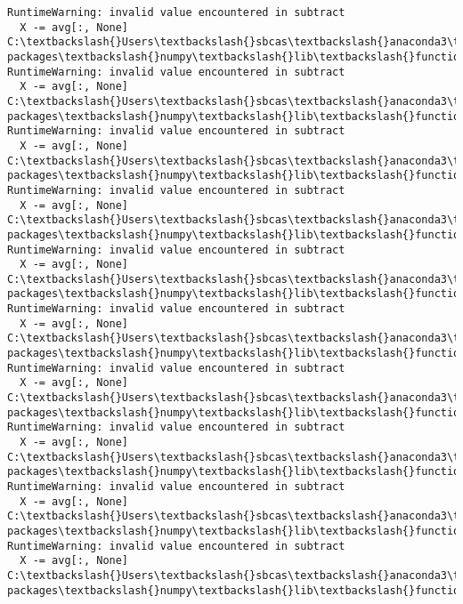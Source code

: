 \documentclass[11pt]{article}
\begin{document}
\begin{Verbatim}[commandchars=\\\{\}]
RuntimeWarning: invalid value encountered in subtract
  X -= avg[:, None]
C:\textbackslash{}Users\textbackslash{}sbcas\textbackslash{}anaconda3\textbackslash{}lib\textbackslash{}site-packages\textbackslash{}numpy\textbackslash{}lib\textbackslash{}function\_base.py:2474:
RuntimeWarning: invalid value encountered in subtract
  X -= avg[:, None]
C:\textbackslash{}Users\textbackslash{}sbcas\textbackslash{}anaconda3\textbackslash{}lib\textbackslash{}site-packages\textbackslash{}numpy\textbackslash{}lib\textbackslash{}function\_base.py:2474:
RuntimeWarning: invalid value encountered in subtract
  X -= avg[:, None]
C:\textbackslash{}Users\textbackslash{}sbcas\textbackslash{}anaconda3\textbackslash{}lib\textbackslash{}site-packages\textbackslash{}numpy\textbackslash{}lib\textbackslash{}function\_base.py:2474:
RuntimeWarning: invalid value encountered in subtract
  X -= avg[:, None]
C:\textbackslash{}Users\textbackslash{}sbcas\textbackslash{}anaconda3\textbackslash{}lib\textbackslash{}site-packages\textbackslash{}numpy\textbackslash{}lib\textbackslash{}function\_base.py:2474:
RuntimeWarning: invalid value encountered in subtract
  X -= avg[:, None]
C:\textbackslash{}Users\textbackslash{}sbcas\textbackslash{}anaconda3\textbackslash{}lib\textbackslash{}site-packages\textbackslash{}numpy\textbackslash{}lib\textbackslash{}function\_base.py:2474:
RuntimeWarning: invalid value encountered in subtract
  X -= avg[:, None]
C:\textbackslash{}Users\textbackslash{}sbcas\textbackslash{}anaconda3\textbackslash{}lib\textbackslash{}site-packages\textbackslash{}numpy\textbackslash{}lib\textbackslash{}function\_base.py:2474:
RuntimeWarning: invalid value encountered in subtract
  X -= avg[:, None]
C:\textbackslash{}Users\textbackslash{}sbcas\textbackslash{}anaconda3\textbackslash{}lib\textbackslash{}site-packages\textbackslash{}numpy\textbackslash{}lib\textbackslash{}function\_base.py:2474:
RuntimeWarning: invalid value encountered in subtract
  X -= avg[:, None]
C:\textbackslash{}Users\textbackslash{}sbcas\textbackslash{}anaconda3\textbackslash{}lib\textbackslash{}site-packages\textbackslash{}numpy\textbackslash{}lib\textbackslash{}function\_base.py:2474:
RuntimeWarning: invalid value encountered in subtract
  X -= avg[:, None]
C:\textbackslash{}Users\textbackslash{}sbcas\textbackslash{}anaconda3\textbackslash{}lib\textbackslash{}site-packages\textbackslash{}numpy\textbackslash{}lib\textbackslash{}function\_base.py:2474:
RuntimeWarning: invalid value encountered in subtract
  X -= avg[:, None]
C:\textbackslash{}Users\textbackslash{}sbcas\textbackslash{}anaconda3\textbackslash{}lib\textbackslash{}site-packages\textbackslash{}numpy\textbackslash{}lib\textbackslash{}function\_base.py:2474:

\end{Verbatim}
\end{document}
